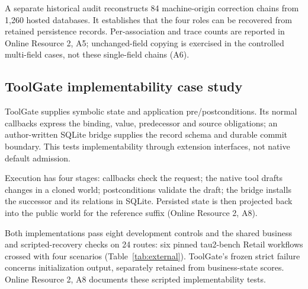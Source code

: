 \documentclass[pdflatex,sn-basic]{sn-jnl}
\begin{document}
A separate historical audit reconstructs 84 machine-origin correction chains from 1,260 hosted databases. It establishes that the four roles can be recovered from retained persistence records. Per-association and trace counts are reported in Online Resource 2, A5; unchanged-field copying is exercised in the controlled multi-field cases, not these single-field chains (A6).

\subsection{ToolGate implementability case study}\label{configured-toolgate-on-public-reference-workflows}

ToolGate \citep{toolgate} supplies symbolic state and application pre/postconditions. Its normal callbacks express the binding, value, predecessor and source obligations; an author-written SQLite bridge supplies the record schema and durable commit boundary. This tests implementability through extension interfaces, not native default admission.

Execution has four stages: callbacks check the request; the native tool drafts changes in a cloned world; postconditions validate the draft; the bridge installs the successor and its relations in SQLite. Persisted state is then projected back into the public world for the reference suffix (Online Resource 2, A8).

Both implementations pass eight development controls and the shared business and scripted-recovery checks on 24 routes: six pinned tau2-bench Retail workflows \citep{tau2-bench} crossed with four scenarios (Table~\ref{tab:external}). ToolGate's frozen strict failure concerns initialization output, separately retained from business-state scores. Online Resource 2, A8 documents these scripted implementability tests.
\end{document}

